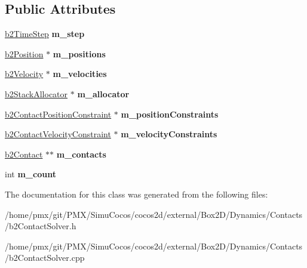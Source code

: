 \subsection*{Public Attributes}
\begin{DoxyCompactItemize}
\item 
\mbox{\label{classb2ContactSolver_aac78600ba5fd3249bac20678cbc9f101}} 
\hyperlink{structb2TimeStep}{b2\+Time\+Step} {\bfseries m\+\_\+step}
\item 
\mbox{\label{classb2ContactSolver_a8e2502854faa795d6d173eac1ac18634}} 
\hyperlink{structb2Position}{b2\+Position} $\ast$ {\bfseries m\+\_\+positions}
\item 
\mbox{\label{classb2ContactSolver_a62dd6eae187bbefc1521a36d5f315aed}} 
\hyperlink{structb2Velocity}{b2\+Velocity} $\ast$ {\bfseries m\+\_\+velocities}
\item 
\mbox{\label{classb2ContactSolver_ad789ee294ed921c5674850d27b57a1af}} 
\hyperlink{classb2StackAllocator}{b2\+Stack\+Allocator} $\ast$ {\bfseries m\+\_\+allocator}
\item 
\mbox{\label{classb2ContactSolver_ab80c5d09ec48fb6ba167b5dea9078160}} 
\hyperlink{structb2ContactPositionConstraint}{b2\+Contact\+Position\+Constraint} $\ast$ {\bfseries m\+\_\+position\+Constraints}
\item 
\mbox{\label{classb2ContactSolver_a5f8e3d0b82c0118f8dc57ecc95020dbf}} 
\hyperlink{structb2ContactVelocityConstraint}{b2\+Contact\+Velocity\+Constraint} $\ast$ {\bfseries m\+\_\+velocity\+Constraints}
\item 
\mbox{\label{classb2ContactSolver_ab8b806704b3a79cc9327a0afeefe2eac}} 
\hyperlink{classb2Contact}{b2\+Contact} $\ast$$\ast$ {\bfseries m\+\_\+contacts}
\item 
\mbox{\label{classb2ContactSolver_ab5b74c0fadf0d5d8997700b5ff91ea91}} 
int {\bfseries m\+\_\+count}
\end{DoxyCompactItemize}


The documentation for this class was generated from the following files\+:\begin{DoxyCompactItemize}
\item 
/home/pmx/git/\+P\+M\+X/\+Simu\+Cocos/cocos2d/external/\+Box2\+D/\+Dynamics/\+Contacts/b2\+Contact\+Solver.\+h\item 
/home/pmx/git/\+P\+M\+X/\+Simu\+Cocos/cocos2d/external/\+Box2\+D/\+Dynamics/\+Contacts/b2\+Contact\+Solver.\+cpp\end{DoxyCompactItemize}

